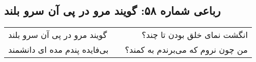 \begin{center}
\section*{رباعی شماره ۵۸: گویند مرو در پی آن سرو بلند}
\label{sec:058}
\begin{longtable}{l p{0.5cm} r}
گویند مرو در پی آن سرو بلند
&&
انگشت نمای خلق بودن تا چند؟
\\
بی‌فایده پندم مده ای دانشمند
&&
من چون نروم که می‌برندم به کمند؟
\\
\end{longtable}
\end{center}
